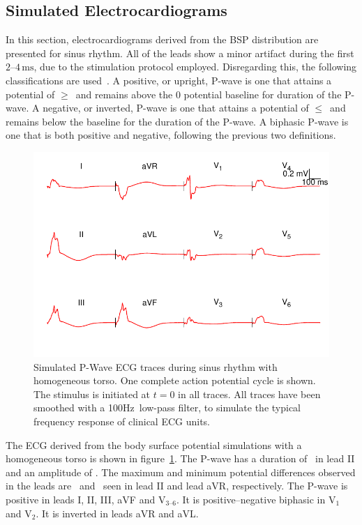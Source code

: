 \subsection{Simulated Electrocardiograms}

In this section, electrocardiograms derived from the BSP distribution are
presented for sinus rhythm.
All of the leads show a minor artifact during the first
$2\text{--}4\,\text{ms}$, due to the stimulation protocol employed.
Disregarding this, the following classifications are used~\cite{Kistler2006}.
A positive, or upright, P-wave is one that attains a potential of
$\geq$\ and remains above the 0 potential baseline for duration of the
P-wave.
A negative, or inverted, P-wave is one that attains a potential of
$\leq$\ and remains below the baseline for the duration of the P-wave.
A biphasic P-wave is one that is both positive and negative, following the
previous two definitions.


\begin{figure}
\includegraphics{figures/bsp/ecg_torso}
\caption[12 lead P-wave ECG during sinus rhythm with homogeneous torso]{
\label{bsp:fig:ecg_torso}
Simulated P-Wave ECG traces during sinus rhythm with homogeneous torso.
One complete action potential cycle is shown.
The stimulus is initiated at $t = 0$ in all traces.
All traces have been smoothed with a \unit{100}{Hz}\ low-pass filter, to
simulate the typical frequency response of clinical ECG units.
}
\end{figure}

The ECG derived from the body surface potential simulations with a homogeneous
torso is shown in figure~\ref{bsp:fig:ecg_torso}.
The P-wave has a duration of \ in lead II and an amplitude of .
The maximum and minimum potential differences observed in the leads are
\ and \ seen in lead II and lead aVR, respectively.
The P-wave is positive in leads I, II, III, aVF and $\text{V}_{\text{3--6}}$.
It is positive--negative biphasic in $\text{V}_{\text{1}}$ and $\text{V}_{\text{2}}$.
It is inverted in leads aVR and aVL.

